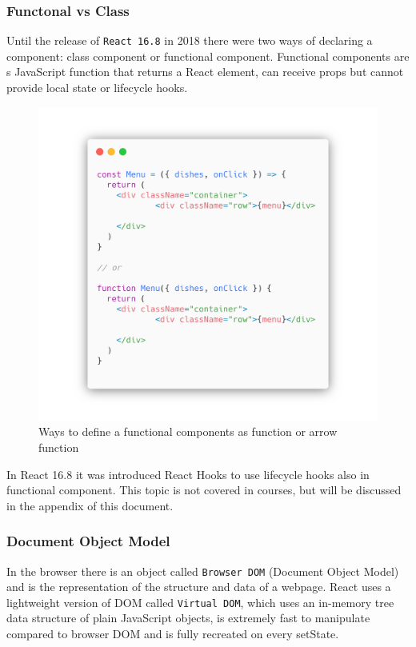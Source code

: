 \subsubsection*{Functonal vs Class}
Until the release of \texttt{React 16.8} in 2018 there were two ways of declaring a component: class component or functional component. Functional components are s JavaScript function that returns a React element, can receive props but cannot provide local state or lifecycle hooks. 
\begin{figure}
    \includegraphics[width=\textwidth]{assets/class-vs-functional.png}
    \caption{Ways to define a functional components as function or arrow function}
\end{figure}

In React 16.8 it was introduced React Hooks to use lifecycle hooks also in functional component. This topic is not covered in courses, but will be discussed in the appendix of this document.

\subsubsection*{Document Object Model}
In the browser there is an object called \texttt{Browser DOM} (Document Object Model) and is the representation of the structure and data of a webpage. React uses a lightweight version of DOM called \texttt{Virtual DOM}, which uses an in-memory tree data structure of plain JavaScript objects, is extremely fast to manipulate compared to browser DOM and is fully recreated on every setState. 

